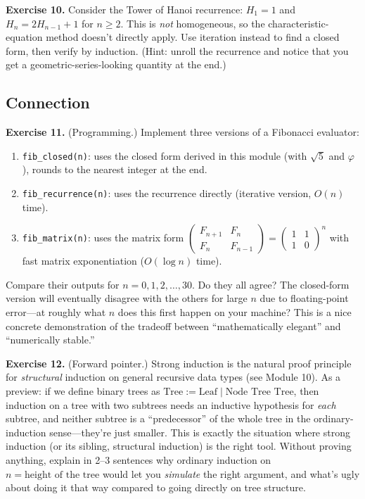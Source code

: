 \documentclass[11pt]{article}
\begin{document}
\bigskip
\textbf{Exercise 10.}\label{ex:m9:10} Consider the Tower of Hanoi recurrence: $H_1 = 1$ and $H_n = 2 H_{n-1} + 1$ for $n \geq 2$. This is \emph{not} homogeneous, so the characteristic-equation method doesn't directly apply. Use iteration instead to find a closed form, then verify by induction. (Hint: unroll the recurrence and notice that you get a geometric-series-looking quantity at the end.)

\subsection*{Connection}

\textbf{Exercise 11.}\label{ex:m9:11} (Programming.) Implement three versions of a Fibonacci evaluator:
\begin{enumerate}[label=(\alph*)]
  \item \texttt{fib\_closed(n)}: uses the closed form derived in this module (with $\sqrt{5}$ and $\varphi$), rounds to the nearest integer at the end.
  \item \texttt{fib\_recurrence(n)}: uses the recurrence directly (iterative version, $O(n)$ time).
  \item \texttt{fib\_matrix(n)}: uses the matrix form $\begin{pmatrix} F_{n+1} & F_n \\ F_n & F_{n-1} \end{pmatrix} = \begin{pmatrix} 1 & 1 \\ 1 & 0 \end{pmatrix}^n$ with fast matrix exponentiation ($O(\log n)$ time).
\end{enumerate}
Compare their outputs for $n = 0, 1, 2, \ldots, 30$. Do they all agree? The closed-form version will eventually disagree with the others for large $n$ due to floating-point error---at roughly what $n$ does this first happen on your machine? This is a nice concrete demonstration of the tradeoff between ``mathematically elegant'' and ``numerically stable.''

\bigskip
\textbf{Exercise 12.}\label{ex:m9:12} (Forward pointer.) Strong induction is the natural proof principle for \emph{structural} induction on general recursive data types (see Module 10). As a preview: if we define binary trees as $\text{Tree} := \text{Leaf} \mid \text{Node Tree Tree}$, then induction on a tree with two subtrees needs an inductive hypothesis for \emph{each} subtree, and neither subtree is a ``predecessor'' of the whole tree in the ordinary-induction sense---they're just smaller. This is exactly the situation where strong induction (or its sibling, structural induction) is the right tool. Without proving anything, explain in 2--3 sentences why ordinary induction on $n = \text{height of the tree}$ would let you \emph{simulate} the right argument, and what's ugly about doing it that way compared to going directly on tree structure.
\end{document}
